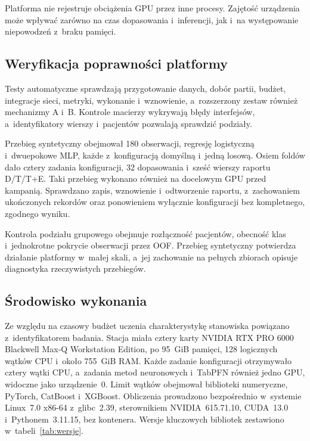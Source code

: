 Platforma nie rejestruje obciążenia GPU przez inne procesy. Zajętość urządzenia może wpływać zarówno na czas dopasowania i~inferencji, jak i~na występowanie niepowodzeń z~braku pamięci.

\subsection{Weryfikacja poprawności platformy}
\label{sec:kwalifikacja}

Testy automatyczne sprawdzają przygotowanie danych, dobór partii, budżet, integracje sieci, metryki, wykonanie i~wznowienie, a~rozszerzony zestaw również mechanizmy A i~B. Kontrole macierzy wykrywają błędy interfejsów, a~identyfikatory wierszy i~pacjentów pozwalają sprawdzić podziały.

Przebieg syntetyczny obejmował 180 obserwacji, regresję logistyczną i~dwuepokowe MLP, każde z~konfiguracją domyślną i~jedną losową. Osiem foldów dało cztery zadania konfiguracji, 32 dopasowania i~sześć wierszy raportu D/T/T+E. Taki przebieg wykonano również na docelowym GPU przed kampanią. Sprawdzano zapis, wznowienie i~odtworzenie raportu, z~zachowaniem ukończonych rekordów oraz ponowieniem wyłącznie konfiguracji bez kompletnego, zgodnego wyniku.

Kontrola podziału grupowego obejmuje rozłączność pacjentów, obecność klas i~jednokrotne pokrycie obserwacji przez OOF. Przebieg syntetyczny potwierdza działanie platformy w~małej skali, a~jej zachowanie na pełnych zbiorach opisuje diagnostyka rzeczywistych przebiegów.

\subsection{Środowisko wykonania}
\label{sec:wykonanie-kampanii}

Ze względu na czasowy budżet uczenia charakterystykę stanowiska powiązano z~identyfikatorem badania. Stacja miała cztery karty NVIDIA RTX PRO 6000 Blackwell Max-Q Workstation Edition, po 95~GiB pamięci, 128 logicznych wątków CPU i~około 755~GiB RAM. Każde zadanie konfiguracji otrzymywało cztery wątki CPU, a~zadania metod neuronowych i~TabPFN również jedno GPU, widoczne jako urządzenie~0. Limit wątków obejmował biblioteki numeryczne, PyTorch, CatBoost i~XGBoost. Obliczenia prowadzono bezpośrednio w~systemie Linux~7.0 x86-64 z~glibc~2.39, sterownikiem NVIDIA~615.71.10, CUDA~13.0 i~Pythonem~3.11.15, bez kontenera. Wersje kluczowych bibliotek zestawiono w~tabeli~\ref{tab:wersje}.

